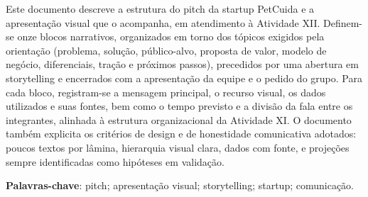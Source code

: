 \begin{resumo}[RESUMO]
\begin{SingleSpace}
\noindent Este documento descreve a estrutura do pitch da startup PetCuida e a apresentação visual que o acompanha, em atendimento à Atividade XII. Definem-se onze blocos narrativos, organizados em torno dos tópicos exigidos pela orientação (problema, solução, público-alvo, proposta de valor, modelo de negócio, diferenciais, tração e próximos passos), precedidos por uma abertura em storytelling e encerrados com a apresentação da equipe e o pedido do grupo. Para cada bloco, registram-se a mensagem principal, o recurso visual, os dados utilizados e suas fontes, bem como o tempo previsto e a divisão da fala entre os integrantes, alinhada à estrutura organizacional da Atividade XI. O documento também explicita os critérios de design e de honestidade comunicativa adotados: poucos textos por lâmina, hierarquia visual clara, dados com fonte, e projeções sempre identificadas como hipóteses em validação.

\vspace{\onelineskip}
\noindent\textbf{Palavras-chave}: pitch; apresentação visual; storytelling; startup; comunicação.
\end{SingleSpace}
\end{resumo}
